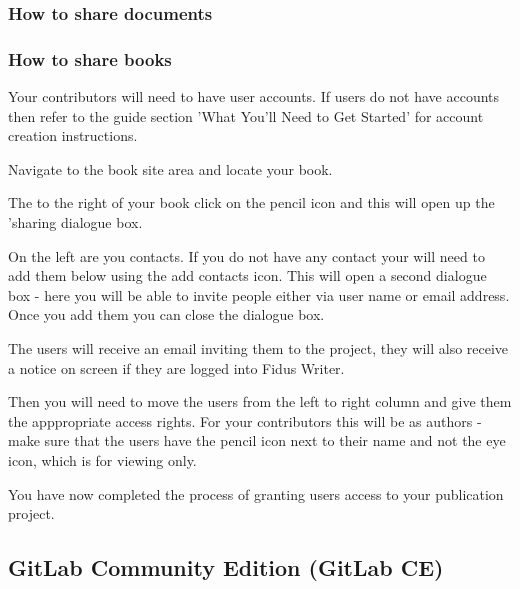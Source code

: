 \documentclass{article}
\begin{document}
\subsubsection{How to share documents}\label{H3072165}






\subsubsection{How to share books}\label{H3372306}



Your contributors will need to have user accounts. If users do not have accounts then refer to the guide section 'What You'll Need to Get Started' for account creation instructions.


Navigate to the book site area and locate your book.


The to the right of your book click on the pencil icon and this will open up the 'sharing dialogue box.


On the left are you contacts. If you do not have any contact your will need to add them below using the add contacts icon. This will open a second dialogue box - here you will be able to invite people either via user name or email address. Once you add them you can close the dialogue box.


The users will receive an email inviting them to the project, they will also receive a notice on screen if they are logged into Fidus Writer.


Then you will need to move the users from the left to right column and give them the apppropriate access rights. For your contributors this will be as authors - make sure that the users have the pencil icon next to their name and not the eye icon, which is for viewing only.


You have now completed the process of granting users access to your publication project.


\subsection{GitLab Community Edition (GitLab CE)}\label{H7934822}
\end{document}
